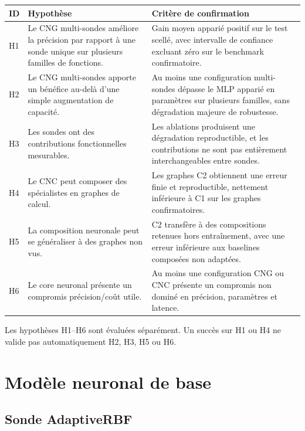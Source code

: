 \documentclass[11pt,a4paper]{article}
\begin{document}
\begin{longtable}{>{\RaggedRight\arraybackslash}p{}
                  >{\RaggedRight\arraybackslash}p{}
                  >{\RaggedRight\arraybackslash}p{}}
\toprule
\textbf{ID} & \textbf{Hypothèse} & \textbf{Critère de confirmation} \\
\midrule
H1 & Le CNG multi-sondes améliore la précision par rapport à une sonde
unique sur plusieurs familles de fonctions. &
Gain moyen apparié positif sur le test scellé, avec intervalle de
confiance excluant zéro sur le benchmark confirmatoire. \\
\addlinespace
H2 & Le CNG multi-sondes apporte un bénéfice au-delà d'une simple
augmentation de capacité. &
Au moins une configuration multi-sondes dépasse le MLP apparié en
paramètres sur plusieurs familles, sans dégradation majeure de
robustesse. \\
\addlinespace
H3 & Les sondes ont des contributions fonctionnelles mesurables. &
Les ablations produisent une dégradation reproductible, et les
contributions ne sont pas entièrement interchangeables entre sondes. \\
\addlinespace
H4 & Le CNC peut composer des spécialistes en graphes de calcul. &
Les graphes C2 obtiennent une erreur finie et reproductible, nettement
inférieure à C1 sur les graphes confirmatoires. \\
\addlinespace
H5 & La composition neuronale peut se généraliser à des graphes non vus. &
C2 transfère à des compositions retenues hors entraînement, avec une
erreur inférieure aux baselines composées non adaptées. \\
\addlinespace
H6 & Le core neuronal présente un compromis précision/coût utile. &
Au moins une configuration CNG ou CNC présente un compromis
non dominé en précision, paramètres et latence. \\
\bottomrule
\end{longtable}

Les hypothèses H1--H6 sont évaluées séparément. Un succès sur H1 ou H4
ne valide pas automatiquement H2, H3, H5 ou H6.

\section{Modèle neuronal de base}

\subsection{Sonde AdaptiveRBF}
\end{document}
